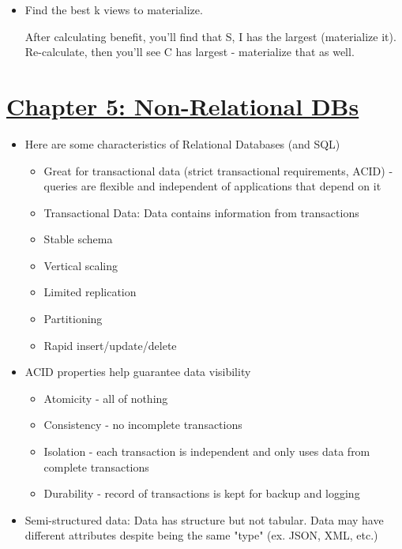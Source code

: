 \documentclass[8pt,landscape,a4paper, fleqn, dvipsnames]{extarticle}
\begin{document}
\begin{multicols*}{4}
\begin{itemize}
    {S, I, C} = 6M, {S, I} = 0.8M, {S} = 0.01M

    B{S, I} = 5.2M, B{S} = 0, B{I} = 5.2M, B{} = 0
    
    B({S, I}, {{S, I, C} {S}}) = 5.2M * 2
    \item Find the best k views to materialize.

    After calculating benefit, you'll find that {S, I} has the largest (materialize it). Re-calculate, then you'll see C has largest - materialize that as well.
    \end{itemize}

\section*{\ul{Chapter 5: Non-Relational DBs}}
\begin{itemize}
    \item Here are some characteristics of Relational Databases (and SQL)
    \begin{itemize}
        \item Great for transactional data (strict transactional requirements, ACID) - queries are flexible and independent of applications that depend on it
        \item Transactional Data: Data contains information from transactions
        \item Stable schema
        \item Vertical scaling
        \item Limited replication 
        \item Partitioning
        \item Rapid insert/update/delete
    \end{itemize}
    \item ACID properties help guarantee data visibility
    \begin{itemize}
        \item Atomicity - all of nothing
        \item Consistency - no incomplete transactions
        \item Isolation - each transaction is independent and only uses data from complete transactions
        \item Durability - record of transactions is kept for backup and logging
    \end{itemize}
    \item Semi-structured data: Data has structure but not tabular. Data may have different attributes despite being the same "type" (ex. JSON, XML, etc.)

\end{itemize}
\end{multicols*}
\end{document}

